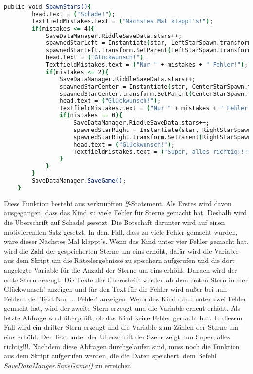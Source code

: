 \begin{lstlisting}[language=csh, caption={SpawnStars.cs Start-Funktion}]
	public void SpawnStars(){
		head.text = ("Schade!");
		TextfieldMistakes.text = ("Nächstes Mal klappt's!");
		if(mistakes <= 4){
			SaveDataManager.RiddleSaveData.stars++;
			spawnedStarLeft = Instantiate(star, LeftStarSpawn.transform.position, Quaternion.identity);
			spawnedStarLeft.transform.SetParent(LeftStarSpawn.transform);
			head.text = ("Glückwunsch!");
			TextfieldMistakes.text = ("Nur " + mistakes + " Fehler!");
			if(mistakes <= 2){
				SaveDataManager.RiddleSaveData.stars++;
				spawnedStarCenter = Instantiate(star, CenterStarSpawn.transform.position, Quaternion.identity);
				spawnedStarCenter.transform.SetParent(CenterStarSpawn.transform);
				head.text = ("Glückwunsch!");
				TextfieldMistakes.text = ("Nur " + mistakes + " Fehler!");
				if(mistakes == 0){
					SaveDataManager.RiddleSaveData.stars++;
					spawnedStarRight = Instantiate(star, RightStarSpawn.transform.position, Quaternion.identity);
					spawnedStarRight.transform.SetParent(RightStarSpawn.transform);
					head.text = ("Glückwunsch!");
					TextfieldMistakes.text = ("Super, alles richtig!!!");
				}
			}
		}
		SaveDataManager.SaveGame();
	}
\end{lstlisting}
Diese Funktion besteht aus verknüpften \textit{ff}-Statement. Als Erstes wird davon ausgegangen, dass das Kind zu viele Fehler für Sterne gemacht hat. Deshalb wird die Überschrift auf \dq Schade!\dq{} gesetzt. Die Botschaft darunter wird auf einen motivierenden Satz gesetzt. In dem Fall, dass zu viele Fehler gemacht wurden, wäre dieser \dq Nächstes Mal klappt's\dq{}. Wenn das Kind unter vier Fehler gemacht hat, wird die Zahl der gespeicherten Sterne um eins erhöht, dafür wird die Variable aus dem Skript um die Rätselergebnisse zu speichern aufgerufen und die dort angelegte Variable für die Anzahl der Sterne um eins erhöht. Danach wird der erste Stern erzeugt. Die Texte der Überschrift werden ab dem ersten Stern immer \dq Glückwunsch!\dq{} anzeigen und für den Text für die Fehler wird außer bei null Fehlern der Text \dq Nur ... Fehler!\dq{} anzeigen. Wenn das Kind dann unter zwei Fehler gemacht hat, wird der zweite Stern erzeugt und die Variable erneut erhöht. Als letzte Abfrage wird überprüft, ob das Kind keine Fehler gemacht hat. In diesem Fall wird ein dritter Stern erzeugt und die Variable zum Zählen der Sterne um eins erhöht. Der Text unter der Überschrift der Szene zeigt nun \dq Super, alles richtig!!!\dq{}. Nachdem diese Abfragen durchgelaufen sind, muss noch die Funktion aus dem Skript aufgerufen werden, die die Daten speichert. dem Befehl \textit{SaveDataManger.SaveGame()} zu erreichen.\\